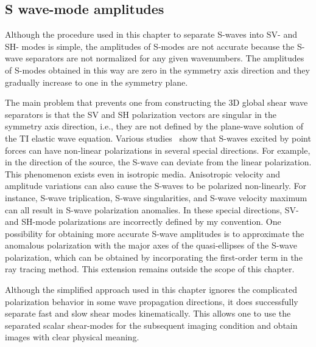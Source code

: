 \subsection{S wave-mode amplitudes}
Although the procedure used in this chapter to separate S-waves into SV-
and SH- modes is simple, the amplitudes of S-modes are not accurate
because the S-wave separators are not normalized for any given
wavenumbers. The amplitudes of S-modes obtained in this way are zero
in the symmetry axis direction and they gradually increase to one in
the symmetry plane.

The main problem that prevents one from constructing the 3D global
shear wave separators is that the SV and SH polarization vectors are
singular in the symmetry axis direction, i.e., they are not defined by
the plane-wave solution of the TI elastic wave equation. Various
studies~\cite[]{Kieslev,Tsvankin} show that S-waves excited by point
forces can have non-linear polarizations in several special
directions. For example, in the direction of the source, the S-wave
can deviate from the linear polarization. This phenomenon exists even
in isotropic media.  Anisotropic velocity and amplitude variations can
also cause the S-waves to be polarized non-linearly.  For instance,
S-wave triplication, S-wave singularities, and S-wave velocity maximum
can all result in S-wave polarization anomalies. In these special
directions, SV- and SH-mode polarizations are incorrectly defined by
my convention.  One possibility for obtaining more accurate S-wave
amplitudes is to approximate the anomalous polarization with the major
axes of the quasi-ellipses of the S-wave polarization, which can be
obtained by incorporating the first-order term in the ray tracing
method. This extension remains outside the scope of this chapter.

Although the simplified approach used in this chapter ignores the complicated
polarization behavior in some wave propagation directions, it does
successfully separate fast and slow shear modes kinematically. This
allows one to use the separated scalar shear-modes for the subsequent
imaging condition and obtain images with clear physical meaning.
